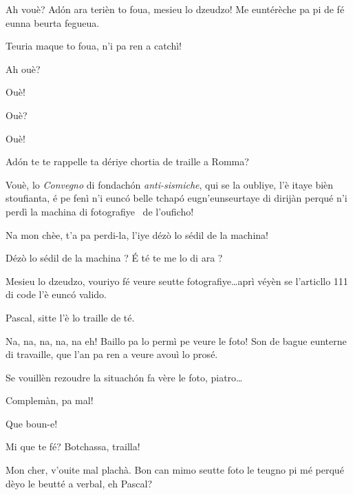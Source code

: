 \begin{drama}
\Bertinaspeaks Ah vouè? Adón ara terièn to foua, mesieu lo dzeudzo! Me euntérèche pa pi de fé eunna beurta fegueua.

\Tobiespeaks Teuria maque to foua, n’i pa ren a catchì!

\Bertinaspeaks Ah ouè?

\Tobiespeaks Ouè!

\Bertinaspeaks Ouè?

\Tobiespeaks Ouè!

\Bertinaspeaks Ad\'on te te rappelle ta dériye chortia de traille a Romma?

\Tobiespeaks Vouè, lo \textit{Convegno} di fondachón \textit{anti-sismiche}, qui se la oubliye, l’è itaye bièn stoufianta, é pe fenì n’i eunc\'o belle tchap\'o eugn’eunseurtaye di dirijàn perqué n’i perdì la machina di fotografiye \macchinaFoto\ de l’ouficho!

\Bertinaspeaks Na mon chèe, t’a pa perdi-la, l'iye dézò lo sédil de la machina!

\Tobiespeaks {} Dézò lo sédil de la machina ? É té te me lo di ara ?

\Bertinaspeaks Mesieu lo dzeudzo, vouriyo fé veure seutte fotografiye\ldots aprì véyèn se l’articllo 111 di code l’è eunc\'o valido.

\DzeudzoSenliquerspeaks Pascal, sitte l’è lo traille de té.

\Tobiespeaks Na, na, na, na, na eh!  Baillo pa lo permì pe veure le foto! Son de bague eunterne di travaille, que l’an pa ren a veure avouì lo prosé.

\DzeudzoSenliquerspeaks Se vouillèn rezoudre la situach\'on fa vère le foto, piatro\ldots



\DzeudzoSenliquerspeaks {} Complemàn, pa mal!

\Simonspeaks Que boun-e!

\Eumprezeospeaks Mi que te fé? Botchassa, trailla!

\DzeudzoSenliquerspeaks {} Mon cher, v'ouite mal plachà. Bon can mimo seutte foto le teugno pi mé perqué dèyo le beutté a verbal, eh Pascal?  \ok


\end{drama}
